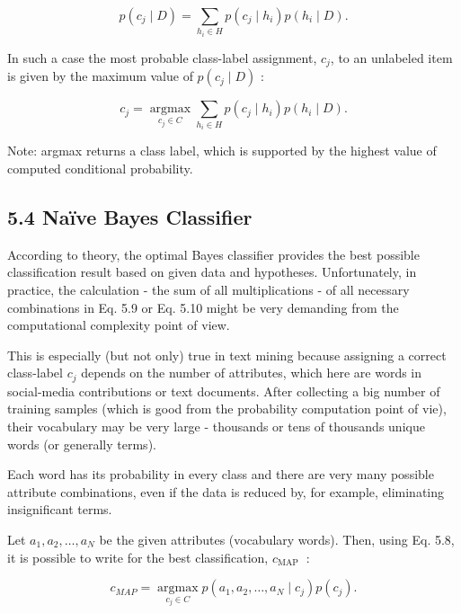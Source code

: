 \documentclass[10pt]{book}
\begin{document}
\begin{equation*}
p\left(c_{j} \mid D\right)=\sum_{h_{i} \in H} p\left(c_{j} \mid h_{i}\right) p\left(h_{i} \mid D\right) . \tag{5.9}
\end{equation*}


In such a case the most probable class-label assignment, $c_{j}$, to an unlabeled item is given by the maximum value of $p\left(c_{j} \mid D\right)$ :


\begin{equation*}
c_{j}=\underset{c_{j} \in C}{\operatorname{argmax}} \sum_{h_{i} \in H} p\left(c_{j} \mid h_{i}\right) p\left(h_{i} \mid D\right) . \tag{5.10}
\end{equation*}


Note: argmax returns a class label, which is supported by the highest value of computed conditional probability.

\subsection*{5.4 Naïve Bayes Classifier}
According to theory, the optimal Bayes classifier provides the best possible classification result based on given data and hypotheses. Unfortunately, in practice, the calculation - the sum of all multiplications - of all necessary combinations in Eq. 5.9 or Eq. 5.10 might be very demanding from the computational complexity point of view.

This is especially (but not only) true in text mining because assigning a correct class-label $c_{j}$ depends on the number of attributes, which here are words in social-media contributions or text documents. After collecting a big number of training samples (which is good from the probability computation point of vie), their vocabulary may be very large - thousands or tens of thousands unique words (or generally terms).

Each word has its probability in every class and there are very many possible attribute combinations, even if the data is reduced by, for example, eliminating insignificant terms.

Let $a_{1}, a_{2}, \ldots, a_{N}$ be the given attributes (vocabulary words). Then, using Eq. 5.8, it is possible to write for the best classification, $c_{\text {MAP }}$ :


\begin{equation*}
c_{M A P}=\underset{c_{j} \in C}{\operatorname{argmax}} p\left(a_{1}, a_{2}, \ldots, a_{N} \mid c_{j}\right) p\left(c_{j}\right) . \tag{5.11}
\end{equation*}
\end{document}

